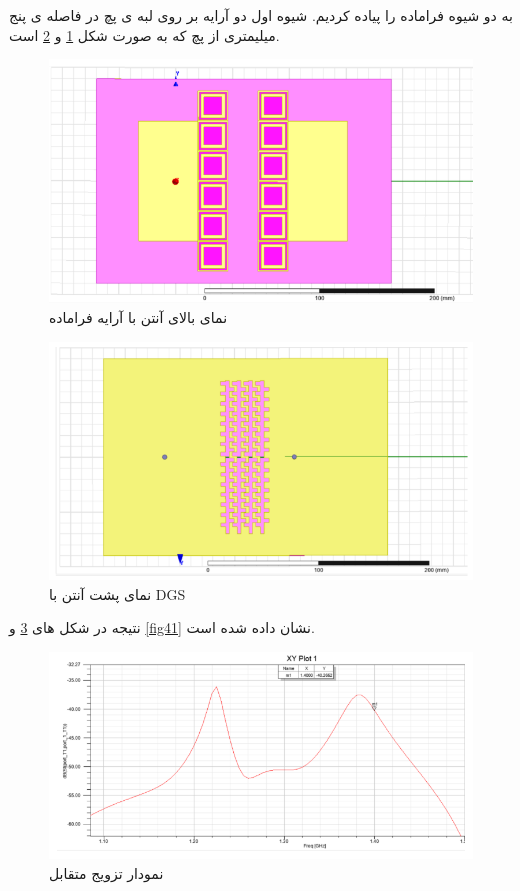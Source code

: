 به دو شیوه فراماده را پیاده کردیم. شیوه اول دو آرایه بر روی لبه ی پچ در فاصله ی پنج میلیمتری از پچ که به صورت شکل
\ref{fig38}
و
\ref{fig39}
است.
\begin{figure}
	\centering
	\includegraphics[scale=0.5]{Images/fig38.png}
	\caption{نمای بالای آنتن با آرایه فراماده}
	\label{fig38}
\end{figure}

\begin{figure}
	\centering
	\includegraphics[scale=0.5]{Images/fig39.png}
	\caption{نمای پشت آنتن با DGS}
	\label{fig39}
\end{figure}

 نتیجه در شکل های 
\ref{fig40}
و
\ref{fig41}
نشان داده شده است.

\begin{figure}
	\centering
	\includegraphics[scale=0.5]{Images/fig40.png}
	\caption{نمودار تزویج متقابل}
	\label{fig40}
\end{figure}

